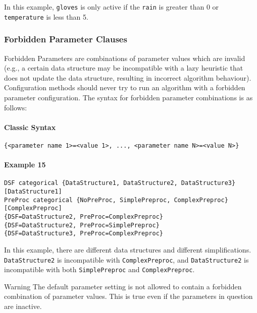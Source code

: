 \documentclass[manual.tex]{subfiles}
\begin{document}
In this example, \texttt{gloves} is only active if the \texttt{rain} is greater than 0 or \texttt{temperature} is less than 5.


\subsubsection{Forbidden Parameter Clauses}

Forbidden Parameters are combinations of parameter values which are invalid (e.g., a certain data structure may be incompatible with a lazy heuristic that does not update the data structure, resulting in incorrect algorithm behaviour).
%
Configuration methods should never try to run an algorithm with a forbidden parameter configuration. 
%
The syntax for forbidden parameter combinations is as follows:

\paragraph{Classic Syntax}

\begin{verbatim}
{<parameter name 1>=<value 1>, ..., <parameter name N>=<value N>}
\end{verbatim}

\paragraph{Example 15}
\begin{verbatim}
DSF categorical {DataStructure1, DataStructure2, DataStructure3}[DataStructure1]
PreProc categorical {NoPreProc, SimplePreproc, ComplexPreproc}[ComplexPreproc]
{DSF=DataStructure2, PreProc=ComplexPreproc}
{DSF=DataStructure2, PreProc=SimplePreproc}
{DSF=DataStructure3, PreProc=ComplexPreproc}
\end{verbatim}

In this example, there are different data structures and different simplifications.
\texttt{DataStructure2} is incompatible with \texttt{ComplexPreproc}, and 
\texttt{DataStructure2} is incompatible with both \texttt{SimplePreproc} and \texttt{ComplexPreproc}.

\begin{bclogo}[logo=\bcattention, couleurBarre=red, noborder=true]{Warning}
The default parameter setting is not allowed to contain a forbidden combination of parameter values. This is true even if the parameters in question are inactive.
\end{bclogo}
\end{document}
